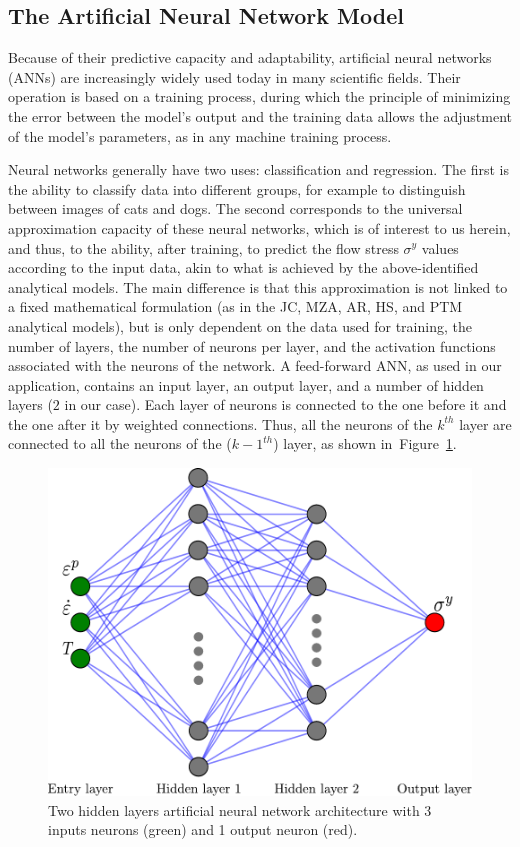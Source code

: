 \documentclass[metals,article,accept,pdftex,moreauthors]{Definitions/mdpi}
\begin{document}
\subsection{The Artificial Neural Network Model\label{sec:ANNmodel}}

Because of their predictive capacity and adaptability, artificial neural networks (ANNs) are increasingly widely used today in many scientific fields.
Their operation is based on a training process, during which the principle of minimizing the error between the model's output and the training data allows the adjustment of the model's parameters, as in any machine training process.

Neural networks generally have two uses: classification and regression.
The first is the ability to classify data into different groups, for example to distinguish between images of cats and dogs.
The second corresponds to the universal approximation capacity of these neural networks, which is of interest to us herein, and thus, to the ability, after training, to predict the flow stress $\sigma^y$ values according to the input data, akin to what is achieved by the above-identified analytical models.
The main difference is that this approximation is not linked to a fixed mathematical formulation (as in the JC, MZA, AR, HS, and PTM analytical models), but is only dependent on the data used for training, the number of layers, the number of neurons per layer, and the activation functions associated with the neurons of the network.
A feed-forward ANN, as used in our application, contains an input layer, an output layer, and a number of hidden layers ($2$ in our case).
Each layer of neurons is connected to the one before it and the one after it by weighted connections.
Thus, all the neurons of the $k^{th}$ layer are connected to all the neurons of the ($k-1^{th}$) layer, as shown in~Figure~\ref{fig:ANN-2HL}.
\begin{figure}[H]

\includegraphics[width=0.7\columnwidth]
{Figures/ANN-scheme-2HL}
\caption{Two hidden layers artificial neural network architecture with 3 inputs neurons (green) and 1 output neuron (red).}
\label{fig:ANN-2HL}
\end{figure}
\end{document}
